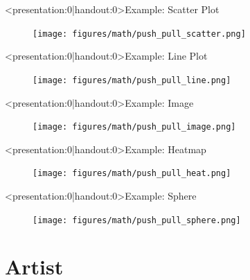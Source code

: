 \documentclass[xcolor={dvipsnames}]{beamer}
\begin{document}
\begin{frame}<presentation:0|handout:0>{Example: Scatter Plot}
    \begin{figure}
        \texttt{[image: figures/math/push\_pull\_scatter.png]}
    \end{figure}
\end{frame}

\begin{frame}<presentation:0|handout:0>{Example: Line Plot}
    \begin{figure}
        \texttt{[image: figures/math/push\_pull\_line.png]}
    \end{figure}
\end{frame}

\begin{frame}<presentation:0|handout:0>{Example: Image}
    \begin{figure}
        \texttt{[image: figures/math/push\_pull\_image.png]}
    \end{figure}
\end{frame}

\begin{frame}<presentation:0|handout:0>{Example: Heatmap}
    \begin{figure}
        \texttt{[image: figures/math/push\_pull\_heat.png]}
    \end{figure}
\end{frame}

\begin{frame}<presentation:0|handout:0>{Example: Sphere}
    \begin{figure}
        \texttt{[image: figures/math/push\_pull\_sphere.png]}
    \end{figure}
\end{frame}


\section{Artist}
\end{document}

